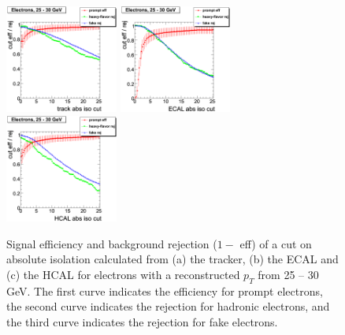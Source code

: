  \begin{figure}[htbp]
    \includegraphics[width = 0.33\textwidth]{pictures/absIsoCut_absIsoCutEff/absIsoCut_trackIso_cutEff_elec_ptCut4_ptCut5.png}
    \includegraphics[width = 0.33\textwidth]{pictures/absIsoCut_absIsoCutEff/absIsoCut_ecalIso_cutEff_elec_ptCut4_ptCut5.png}
    \includegraphics[width = 0.33\textwidth]{pictures/absIsoCut_absIsoCutEff/absIsoCut_hcalIso_cutEff_elec_ptCut4_ptCut5.png}
    \caption{Signal efficiency and background rejection ($1 -$ eff) of a cut on absolute isolation
       calculated from (a) the tracker, (b) the ECAL and (c) the HCAL for electrons with a
       reconstructed $p_{T}$ from 25 -- 30 GeV. The first curve indicates the efficiency for prompt
       electrons, the second curve indicates the rejection for hadronic electrons, and the third
       curve indicates the rejection for fake electrons.}
    \label{fig:AbsIsoCut_CutEffRej_Elec_PtCut4_PtCut5}
 \end{figure}

 \clearpage

